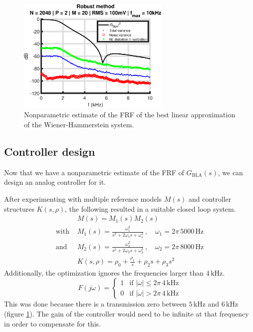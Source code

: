 \begin{figure}[H]
\centering
\includegraphics[width = 0.65\textwidth]{figures/robust_method_G.eps}
\caption{Nonparametric estimate of the FRF of the best linear approximation of the Wiener-Hammerstein system.}
\label{fig:GBLA_nonparam}
\end{figure}

\subsection{Controller design}
\label{sec:controller_design_controller}
Now that we have a nonparametric estimate of the FRF of $G_{\textrm{BLA}}(s)$, we can design an analog controller for it.

After experimenting with multiple reference models $M(s)$ and controller structures $K(s,\rho)$, the following resulted in a suitable closed loop system.
\begin{align*}
&M(s) = M_1(s) M_2(s) \\
\text{with } &M_1(s) = \frac{\omega_1^2}{s^2 + 2\omega_1s + \omega_1^2} \,, \quad \omega_1 = 2 \pi \, 5000 \, \mathrm{Hz} \\
\text{and } &M_2(s) = \frac{\omega_2^2}{s^2 + 2\omega_2s + \omega_2^2} \,, \quad \omega_2 = 2 \pi \, 8000 \, \mathrm{Hz} \\
&K(s,\rho) = \rho_0 + \frac{\rho_1}{s} + \rho_2 s + \rho_3 s^2
\end{align*}
Additionally, the optimization ignores the frequencies larger than $4 \, \mathrm{kHz}$.
\begin{equation*}
	F(j \omega) = \begin{cases}
		1 & \text{if } |\omega| \leq 2\pi \, 4 \, \mathrm{kHz} \\
		0 & \text{if } |\omega| > 2\pi \, 4 \, \mathrm{kHz}
	\end{cases}
\end{equation*}
This was done because there is a transmission zero between $5 \, \mathrm{kHz}$ and $6 \, \mathrm{kHz}$ (figure \ref{fig:GBLA_nonparam}). The gain of the controller would need to be infinite at that frequency in order to compensate for this.

